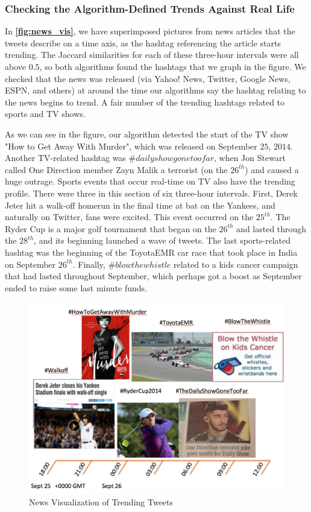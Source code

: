\documentclass[twoside]{article}
\newcommand{\aref}[1]
 {\textbf{\autoref{#1}}}
\begin{document}
\subsubsection{Checking the Algorithm-Defined Trends Against Real Life}

In \aref{fig:news_vis}, we have superimposed pictures from 
news articles that the tweets describe on a time axis, as
the hashtag referencing the article starts trending. The Jaccard similarities 
for each of these three-hour intervals were all above $0.5$, so both algorithms
found the hashtags that we graph in the figure.
We checked that the news was released (via Yahoo! News, Twitter, Google News, ESPN, and others)
at around the time our algorithms say the hashtag relating to the news
begins to trend. A fair number of the trending hashtags related to sports and TV shows. 

As we can see in the figure, our algorithm detected the start of the TV show "How to Get Away With Murder", which was released on September $25$, $2014$. Another TV-related hashtag was $\#dailyshowgonetoofar$, when Jon Stewart called One Direction member Zayn Malik a terrorist (on the $26^{th}$) and caused a huge outrage. Sports events that occur real-time on TV also have the trending profile. There were three in this section of six three-hour intervals. First, Derek Jeter hit a walk-off homerun in the final time at bat on the Yankees, and naturally on Twitter, fans were excited. This event occurred on the $25^{th}$. The Ryder Cup is a major golf tournament that began on the $26^{th}$ and lasted through the $28^{th}$, and its beginning launched a wave of tweets. The last sports-related hashtag was the beginning of the ToyotaEMR car race that took place in India on September $26^{th}$. Finally, $\#blowthewhistle$ related to a kids cancer campaign that had lasted throughout September, which perhaps got a boost as September ended to raise some last minute funds.

\begin{figure} 
\centering
\includegraphics[scale = .4]{Timeline}
\caption{News Visualization of Trending Tweets}
\label{fig:news_vis}
\end{figure}
\end{document}
